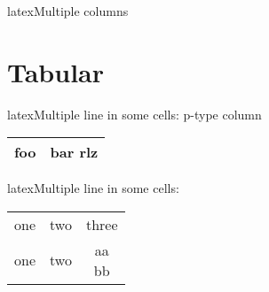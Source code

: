 \documentclass[10pt,a4paper]{article}
\begin{document}
\begin{multicols}{3}
\begin{codebox}{latex}{Multiple columns}
\end{codebox}

{\centering\section{Tabular}}

\begin{codebox}{latex}{Multiple line in some cells: p-type column}
\begin{tabular}{l|p{15mm}}
\hline
foo & bar \newline rlz \\
\hline
\end{tabular}

\end{codebox}


\begin{codebox}{latex}{Multiple line in some cells: \shortstack}
\begin{tabular}{ccc}
one & two & three \\
one & two & \shortstack{aa \\ bb}\\
\end{tabular}

\end{codebox}


\AtNextBibliography{\footnotesize}
\printbibliography  
\end{multicols}
\end{document}
